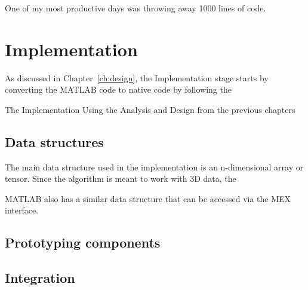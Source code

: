 
\begin{savequote}[0.55\linewidth]
	\begin{fancyquote}
	One of my most productive days was throwing away 1000 lines of code.
	\end{fancyquote}
\end{savequote}
\chapter{Implementation}\label{ch:implementation}

As discussed in Chapter~\ref{ch:design}, the Implementation stage
starts by converting the MATLAB code to native code by following
the 

The Implementation
Using the Analysis and Design from the previous chapters

\section{Data structures}

The main data structure used in the implementation is an
n-dimensional array or tensor. Since the algorithm is meant to
work with 3D data, the 

MATLAB also has a similar data structure that can be accessed via the MEX interface.

\section{Prototyping components}

\section{Integration}

